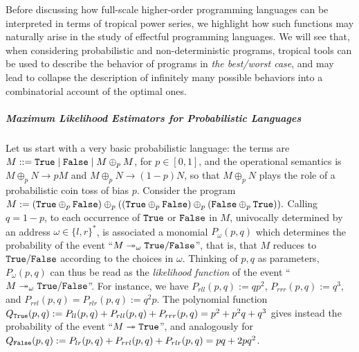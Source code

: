 
Before discussing how full-scale higher-order programming languages can be interpreted in terms of tropical power series, we highlight how such functions may naturally arise in the study of effectful programming languages.
We will see that, when considering probabilistic and non-deterministic programs, tropical tools can be used to describe the behavior of programs in \emph{the best/worst case}, and may lead to collapse the description of infinitely many possible behaviors into a combinatorial account of the optimal ones.




\subparagraph*{Maximum Likelihood Estimators for Probabilistic Languages}

%



Let us start with a very basic probabilistic language:
the terms are $M::= \mathtt{True} \mid \mathtt{False} \mid M\oplus_p M$, for $p\in[0,1]$, and the operational semantics is $M\oplus_p N\to pM$ and $M\oplus_p N \to (1-p)N$, so that $M\oplus_p N$ plays the role of a probabilistic coin toss of bias $p$.
Consider the program
$
 M:=(\mathtt{True} \oplus_p\mathtt{False})\oplus_p((\mathtt{True}\oplus_p\mathtt{False})\oplus_p(\mathtt{False}\oplus_p\mathtt{True})).
 $
 Calling $q=1-p$, to each occurrence of $\mathtt{True}$ or $\mathtt{False}$ in $M$, univocally determined by an address
$\omega\in \{l,r\}^{*}$, is associated a monomial $P_{\omega}(p,q)$ which determines the probability of the event ``$M\twoheadrightarrow_{\omega} \mathtt{True}/\mathtt{False}$'', that is, that $M$ reduces to $\mathtt{True}/\mathtt{False}$ according to the choices in $\omega$.
Thinking of $p,q$ as parameters, $P_{\omega}(p,q)$ can thus be read as the \emph{likelihood function} of the event ``$M\twoheadrightarrow_{\omega} \mathtt{True}/\mathtt{False}$''.
 For instance, we have
$P_{rll}(p,q):=qp^2$,
$P_{rrr}(p,q):=q^3$, and 
$P_{rrl}(p,q)=P_{rlr}(p,q):=q^2p$.
The polynomial function $Q_{\mathtt{True}}(p,q):=P_{ll}(p,q)+P_{rll}(p,q)+P_{rrr}(p,q)=p^2+p^2q+q^3$ gives instead the probability of the event ``$M\twoheadrightarrow \mathtt{True}$'', and analogously for $Q_{\mathtt{False}}(p,q):=P_{lr}(p,q)+P_{rrl}(p,q)+P_{rlr}(p,q)=pq+2pq^2$.

